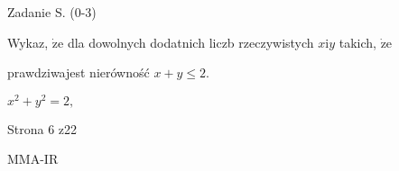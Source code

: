 \documentclass[a4paper,12pt]{article}
\begin{document}
Zadanie S. (0-3)

Wykaz, $\dot{\mathrm{z}}\mathrm{e}$ dla dowolnych dodatnich liczb rzeczywistych $x \mathrm{i} y$ takich, $\dot{\mathrm{z}}\mathrm{e}$

prawdziwajest nierówność $x+y\leq 2.$

$x^{2}+y^{2}=2,$

Strona 6 z22

MMA-IR
\end{document}
